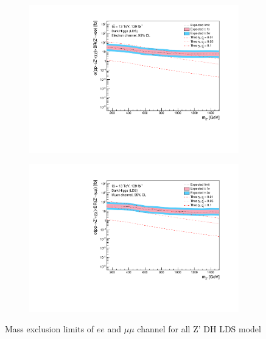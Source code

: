 \documentclass[12pt, a4paper]{book}
\begin{document}
\begin{figure}[!ht]
	\centering
   \begin{subfigure}[b]{0.49\textwidth}
      \centering
      \includegraphics[width=1\textwidth]{Limits/DH_LDS/mass_exclusion_ee.pdf}
      \end{subfigure}
   \hfill
   \begin{subfigure}[b]{0.49\textwidth}
      \centering
      \includegraphics[width=1\textwidth]{Limits/DH_LDS/mass_exclusion_uu.pdf}
      \end{subfigure}
   \caption{Mass exclusion limits of $ee$ and $\mu\mu$ channel for all Z' DH LDS model}\label{fig:DH_LDS_exclusion_ee_uu}
\end{figure}
\clearpage
\end{document}
